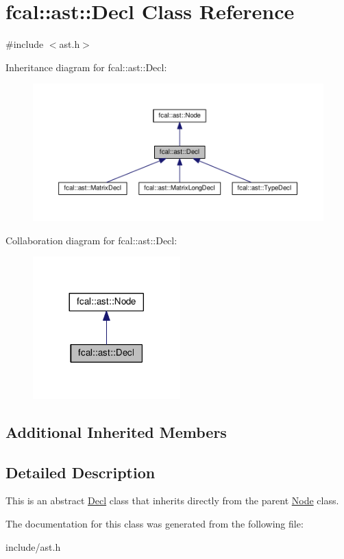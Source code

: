 \hypertarget{classfcal_1_1ast_1_1Decl}{}\section{fcal\+:\+:ast\+:\+:Decl Class Reference}
\label{classfcal_1_1ast_1_1Decl}


{\ttfamily \#include $<$ast.\+h$>$}



Inheritance diagram for fcal\+:\+:ast\+:\+:Decl\+:
\nopagebreak
\begin{figure}[H]
\begin{center}
\leavevmode
\includegraphics[width=350pt]{classfcal_1_1ast_1_1Decl__inherit__graph}
\end{center}
\end{figure}


Collaboration diagram for fcal\+:\+:ast\+:\+:Decl\+:
\nopagebreak
\begin{figure}[H]
\begin{center}
\leavevmode
\includegraphics[width=161pt]{classfcal_1_1ast_1_1Decl__coll__graph}
\end{center}
\end{figure}
\subsection*{Additional Inherited Members}


\subsection{Detailed Description}
This is an abstract \hyperlink{classfcal_1_1ast_1_1Decl}{Decl} class that inherits directly from the parent \hyperlink{classfcal_1_1ast_1_1Node}{Node} class. 

The documentation for this class was generated from the following file\+:\begin{DoxyCompactItemize}
\item 
include/ast.\+h\end{DoxyCompactItemize}
